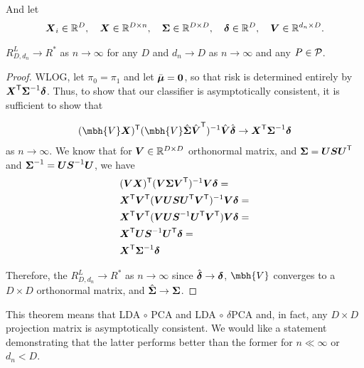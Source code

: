 \documentclass[10pt]{article}
\begin{document}
And let
\begin{align}
	\boldsymbol{X}_i \in \mathbb{R}^D, \quad
	\boldsymbol{X} \in \mathbb{R}^{D \times n}, \quad
	\boldsymbol{\Sigma}  \in \mathbb{R}^{D \times D}, \quad
	\boldsymbol{\delta} \in \mathbb{R}^D, \quad
	\boldsymbol{V} \in \mathbb{R}^{d_n \times D}.
\end{align}


\begin{thm}
$R^L_{D,d_n} \to R^*$ as $n \to \infty$ for any $D$ and $d_n \to D$ as $n \to \infty$ and any $P \in \mathcal{P}$.
\end{thm}

\begin{proof}


WLOG, let $\pi_0=\pi_1$ and let $\bar{\boldsymbol{\mu}}=\boldsymbol{0}$, so that risk is determined entirely by $\boldsymbol{X}^{\mathsf{T}} \boldsymbol{\Sigma}^{-1} \boldsymbol{\delta}$.  Thus, to show that our classifier is asymptotically consistent, it is sufficient to show that

\begin{align}
(\mbh{V} \mb{X})\T (\mbh{V} \mh{\bSig} \mhb{V}\T)^{-1} \mhb{V} \mhb {\delta} \to	\mb{X}\T \bSig^{-1} \mb{\delta} 
\end{align}	
as $n \to \infty$.  We know that for $\boldsymbol{V} \in \mathbb{R}^{D \times D}$ orthonormal matrix, and $\boldsymbol{\Sigma}=\boldsymbol{U} \boldsymbol{S} \boldsymbol{U}^{\mathsf{T}}$ and $\boldsymbol{\Sigma}^{-1}=\boldsymbol{U} \boldsymbol{S}^{-1} \boldsymbol{U}$, we have
\begin{align}
	&(\boldsymbol{V} \boldsymbol{X})^{\mathsf{T}} (\boldsymbol{V} {\boldsymbol{\Sigma}} \boldsymbol{V}^{\mathsf{T}})^{-1} \boldsymbol{V} \boldsymbol{\delta} =\\
	&\boldsymbol{X}^{\mathsf{T}} \boldsymbol{V}^{\mathsf{T}} (\boldsymbol{V} \boldsymbol{U} \boldsymbol{S} \boldsymbol{U}^{\mathsf{T}} \boldsymbol{V}^{\mathsf{T}})^{-1} \boldsymbol{V}  \boldsymbol{\delta} =\\
	&\boldsymbol{X}^{\mathsf{T}} \boldsymbol{V}^{\mathsf{T}} (\boldsymbol{V} \boldsymbol{U} \boldsymbol{S}^{-1} \boldsymbol{U}^{\mathsf{T}} \boldsymbol{V}^{\mathsf{T}}) \boldsymbol{V}  \boldsymbol{\delta} =\\
	&\boldsymbol{X}^{\mathsf{T}}  \boldsymbol{U} \boldsymbol{S}^{-1} \boldsymbol{U}^{\mathsf{T}}  \boldsymbol{\delta} =\\
	&\boldsymbol{X}^{\mathsf{T}}  \boldsymbol{\Sigma}^{-1}  \boldsymbol{\delta} 
\end{align}

Therefore, the $R^L_{D, d_n} \to R^*$ as $n \to \infty$
since $\hat{\boldsymbol{\delta}} \to \boldsymbol{\delta}$, $\mbh{V}$ converges to a $D \times D$ orthonormal matrix, and $\hat{\boldsymbol{\Sigma}} \to \boldsymbol{\Sigma}$.

\end{proof}

\begin{rem}
	This theorem means that LDA $\circ$ PCA and LDA $\circ$ $\delta$PCA and, in fact, any $D \times D$ projection matrix is asymptotically consistent.  We would like a statement demonstrating that the latter performs better than the former for $n \ll \infty$ or $d_n < D$. 
\end{rem}
\end{document}
